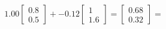\documentclass[preview]{standalone}
\begin{document}
\begin{align*}
1.00 \begin{bmatrix} 0.8 \\ 0.5 \end{bmatrix} + -0.12 \begin{bmatrix} 1 \\ 1.6 \end{bmatrix} = \begin{bmatrix} 0.68 \\ 0.32 \end{bmatrix} =
\end{align*}
\end{document}
